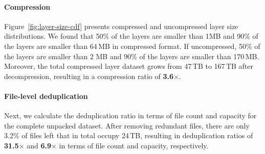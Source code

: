 %
%


%

\paragraph{Compression}
%
Figure~\ref{fig:layer-size-cdf} presents compressed and uncompressed layer size
distributions.
%
We found that 50\% of the layers are smaller than 1MB and 90\% of the layers are
smaller than 64\,MB in compressed format.
%
If uncompressed, 50\% of the layers are smaller than 2 MB and 90\% of the
layers are smaller than 170\,MB.
%
Moreover, the total compressed layer dataset grows from 47\,TB to 167\,TB after
decompression, resulting in a compression ratio of \textbf{3.6$\times$}.

\paragraph{File-level deduplication}
%
%
Next, we calculate the deduplication ratio in terms of file count and capacity for
the complete unpacked dataset.
%
After removing redundant files, there are only 3.2\% of files left that in total occupy
24\,TB, resulting in deduplication ratios of \textbf{31.5$\times$} and
\textbf{6.9$\times$} in terms of file count and capacity, respectively.
%


